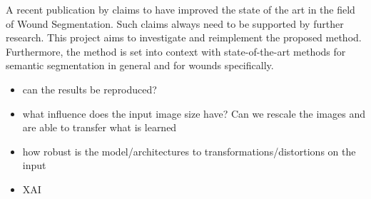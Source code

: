 A recent publication by \citeauthor{Oota_2023_WACV} claims to have improved the state of the art in the field of Wound Segmentation. Such claims always need to be supported by further research. This project aims to investigate and reimplement the proposed method. Furthermore, the method is set into context with state-of-the-art methods for semantic segmentation in general and for wounds specifically. 
\begin{itemize}
	\item can the results be reproduced?
	\item what influence does the input image size have? Can we rescale the images and are able to transfer what is learned
	\item how robust is the model/architectures to transformations/distortions on the input
	\item XAI
\end{itemize}